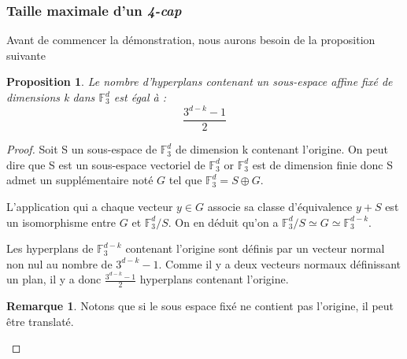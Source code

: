 \documentclass[a4paper,12pt,titlepage]{article}
\theoremstyle{plain}
\newtheorem{prop}{Proposition}
\theoremstyle{definition}
\newtheorem{rmq}{Remarque}
\newcommand{\Ftrois}[1]{\mathbb{F}^#1_3}
\begin{document}
\subsubsection{Taille maximale d'un \emph{4-cap}}
Avant de commencer la démonstration, nous aurons besoin de la proposition suivante
\begin{prop} \label{prop:nbhyp}
Le nombre d'hyperplans contenant un sous-espace affine fixé de dimensions k dans $\Ftrois{d}$ est égal à :
\[
\frac{3^{d-k}-1}{2}
\]
\end{prop}
\begin{proof}
Soit S un sous-espace de $\Ftrois{d}$ de dimension k contenant l'origine. On peut dire que S est un sous-espace vectoriel de $\Ftrois{d}$ or $\Ftrois{d}$ est de dimension finie donc S admet un supplémentaire noté $G$ tel que $\Ftrois{d} = S \oplus G$.

L'application qui a chaque vecteur $y\in G$ associe sa classe d'équivalence $y + S$ est un isomorphisme entre $G$ et $\Ftrois{d}/S$. On en déduit qu'on a $\Ftrois{d}/S \simeq G \simeq \Ftrois{{d-k}}$.

Les hyperplans de $\Ftrois{{d-k}}$ contenant l'origine sont définis par un vecteur normal non nul au nombre de $3^{d-k}-1$. Comme il y a deux vecteurs normaux définissant un plan, il y a donc $\frac{3^{d-k}-1}{2}$ hyperplans contenant l'origine.
\begin{rmq}
Notons que si le sous espace fixé ne contient pas l'origine, il peut être translaté.
\end{rmq}
\end{proof}
\end{document}
